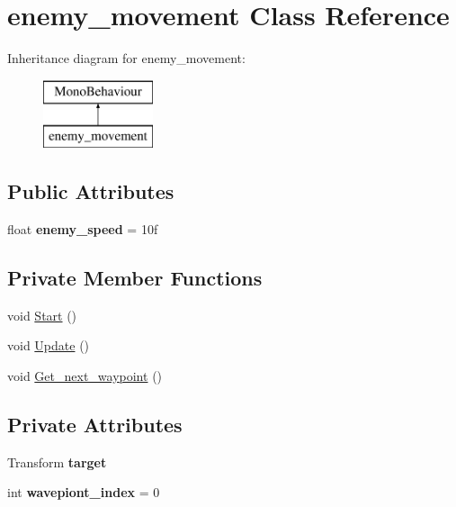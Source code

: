 \hypertarget{classenemy__movement}{}\section{enemy\+\_\+movement Class Reference}
\label{classenemy__movement}
Inheritance diagram for enemy\+\_\+movement\+:\begin{figure}[H]
\begin{center}
\leavevmode
\includegraphics[height=2.000000cm]{classenemy__movement}
\end{center}
\end{figure}
\subsection*{Public Attributes}
\begin{DoxyCompactItemize}
\item 
\mbox{\label{classenemy__movement_aaa269754d38c16dcce632cafebb2e370}} 
float {\bfseries enemy\+\_\+speed} = 10f
\end{DoxyCompactItemize}
\subsection*{Private Member Functions}
\begin{DoxyCompactItemize}
\item 
void \hyperlink{classenemy__movement_a6f78b4e6952786e1ee8d7063b4c59dba}{Start} ()
\item 
void \hyperlink{classenemy__movement_a6937591e8d99aec470f81199b0850967}{Update} ()
\item 
void \hyperlink{classenemy__movement_a0fef8fb95fe93bdc18288cd04cb0af12}{Get\+\_\+next\+\_\+waypoint} ()
\end{DoxyCompactItemize}
\subsection*{Private Attributes}
\begin{DoxyCompactItemize}
\item 
\mbox{\label{classenemy__movement_a21eb53aeae43e83264e5a567dae3382b}} 
Transform {\bfseries target}
\item 
\mbox{\label{classenemy__movement_aeb8340df38b3b6e8d8974fd3ddc1de07}} 
int {\bfseries wavepiont\+\_\+index} = 0
\end{DoxyCompactItemize}


